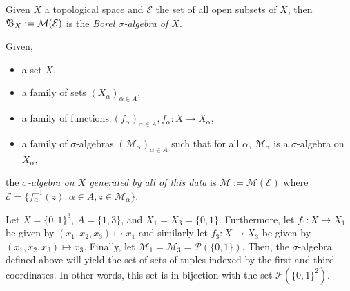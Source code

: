 \documentclass[11pt,leqno,oneside]{amsbook}
\numberwithin{thm}{section}
\renewcommand{\P}{\mathcal{P}}
\newcommand{\M}{\mathcal{M}}
\newcommand{\Ep}{\mathcal{E}}
\begin{document}
\begin{defn}
  Given $X$ a topological space and $\Ep$ the set of all open subsets of $X$,
  then $\B_X := \M(\Ep)$ is the \emph{Borel $\sigma$-algebra of $X$}.
\end{defn}
\begin{defn}
  Given,
  \begin{itemize}
  \item a set $X$,
  \item a family of sets $(X_\alpha)_{\alpha \in A}$,
  \item a family of functions $(f_\alpha)_{\alpha \in A}, f_\alpha: X
    \to X_\alpha$,
  \item a family of $\sigma$-algebras $(\M_\alpha)_{\alpha \in A}$ such
    that for all $\alpha$, $\M_\alpha$ is a $\sigma$-algebra on
    $X_\alpha$,
  \end{itemize}
  the \emph{$\sigma$-algebra on $X$ generated by all of this data} is
  $\M := \M(\Ep)$ where $\Ep = \{f_\alpha^{-1}(z) : \alpha \in A, z \in
  \M_\alpha\}$.
\end{defn}
\begin{example}
  Let $X = \{0,1\}^3$, $A = \{1,3\}$, and $X_1 = X_3 =
  \{0,1\}$. Furthermore, let $f_1: X \to X_1$ be given by
  $(x_1,x_2,x_3) \mapsto x_1$ and similarly let $f_3: X \to X_3$ be given by $(x_1,x_2,x_3) \mapsto x_3$. Finally, let
  $\M_1 = \M_3 = \P(\{0,1\})$. Then, the $\sigma$-algebra defined
  above will yield the set of sets of tuples indexed by the first and
  third coordinates. In other words, this set is in bijection with the
  set $\P(\{0,1\}^2)$.
\end{example}
\end{document}
